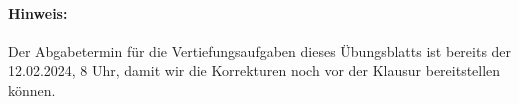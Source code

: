 \paragraph{Hinweis:} Der Abgabetermin für die Vertiefungsaufgaben dieses Übungsblatts
ist bereits der 12.02.2024, 8 Uhr,
damit wir die Korrekturen noch vor der Klausur bereitstellen können.

